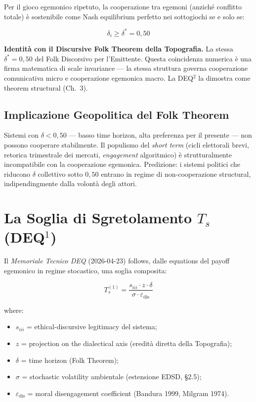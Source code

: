 \Proved{} Per il gioco egemonico ripetuto, la cooperazione tra egemoni
(anziché conflitto totale) è sostenibile come Nash equilibrium
perfetto nei sottogiochi se e solo se:

\[
\delta_i \geq \delta^* = 0{,}50
\]

\Hypoth{} \textbf{Identità con il Discursive Folk Theorem della
Topografia.} La stessa \(\delta^* = 0{,}50\) del Folk Discorsivo per
l'Emittente. Questa coincidenza numerica è una firma matematica di
scale invariance --- la stessa struttura governa cooperazione
comunicativa micro e cooperazione egemonica macro. La DEQ$^2$ la dimostra
come theorem structural (Ch.~3).

\subsection{Implicazione Geopolitica del Folk
Theorem}\label{implicazione-geopolitica-del-folk-theorem}

\Hypoth{} Sistemi con \(\delta < 0{,}50\) --- basso time horizon,
alta preferenza per il presente --- non possono cooperare stabilmente.
Il populismo del \emph{short term} (cicli elettorali brevi, retorica
trimestrale dei mercati, \emph{engagement} algoritmico) è
strutturalmente incompatibile con la cooperazione egemonica. Predizione:
i sistemi politici che riducono \(\delta\) collettivo sotto \(0{,}50\)
entrano in regime di non-cooperazione structural, indipendingmente
dalla volontà degli attori.



\section{\texorpdfstring{La Soglia di Sgretolamento \(T_s\)
(DEQ$^1$)}{La Soglia di Sgretolamento T\_s (DEQ$^1$)}}\label{la-soglia-di-sgretolamento-t_s-dequxb9}

Il \emph{Memoriale Tecnico DEQ} (2026-04-23) follows, dalle equations del
payoff egemonico in regime stocastico, una soglia composita:

\[
T_s^{(1)} = \frac{s_{iii} \cdot z \cdot \delta}{\sigma \cdot \varepsilon_{\text{dis}}}
\]

where:

\begin{itemize}
\tightlist
\item
  \(s_{iii}\) = ethical-discursive legitimacy del sistema;
\item
  \(z\) = projection on the dialectical axis (eredità diretta della
  Topografia);
\item
  \(\delta\) = time horizon (Folk Theorem);
\item
  \(\sigma\) = stochastic volatility ambientale (estensione EDSD, \S{}2.5);
\item
  \(\varepsilon_{\text{dis}}\) = moral disengagement coefficient
  (Bandura 1999, Milgram 1974).
\end{itemize}

